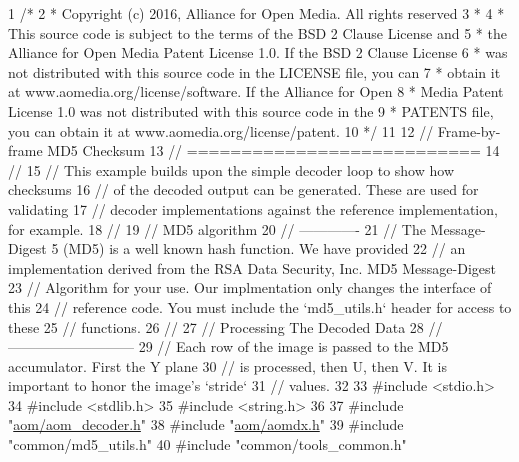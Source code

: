\begin{DoxyCodeInclude}
1 \textcolor{comment}{/*}
2 \textcolor{comment}{ * Copyright (c) 2016, Alliance for Open Media. All rights reserved}
3 \textcolor{comment}{ *}
4 \textcolor{comment}{ * This source code is subject to the terms of the BSD 2 Clause License and}
5 \textcolor{comment}{ * the Alliance for Open Media Patent License 1.0. If the BSD 2 Clause License}
6 \textcolor{comment}{ * was not distributed with this source code in the LICENSE file, you can}
7 \textcolor{comment}{ * obtain it at www.aomedia.org/license/software. If the Alliance for Open}
8 \textcolor{comment}{ * Media Patent License 1.0 was not distributed with this source code in the}
9 \textcolor{comment}{ * PATENTS file, you can obtain it at www.aomedia.org/license/patent.}
10 \textcolor{comment}{ */}
11 
12 \textcolor{comment}{// Frame-by-frame MD5 Checksum}
13 \textcolor{comment}{// ===========================}
14 \textcolor{comment}{//}
15 \textcolor{comment}{// This example builds upon the simple decoder loop to show how checksums}
16 \textcolor{comment}{// of the decoded output can be generated. These are used for validating}
17 \textcolor{comment}{// decoder implementations against the reference implementation, for example.}
18 \textcolor{comment}{//}
19 \textcolor{comment}{// MD5 algorithm}
20 \textcolor{comment}{// -------------}
21 \textcolor{comment}{// The Message-Digest 5 (MD5) is a well known hash function. We have provided}
22 \textcolor{comment}{// an implementation derived from the RSA Data Security, Inc. MD5 Message-Digest}
23 \textcolor{comment}{// Algorithm for your use. Our implmentation only changes the interface of this}
24 \textcolor{comment}{// reference code. You must include the `md5\_utils.h` header for access to these}
25 \textcolor{comment}{// functions.}
26 \textcolor{comment}{//}
27 \textcolor{comment}{// Processing The Decoded Data}
28 \textcolor{comment}{// ---------------------------}
29 \textcolor{comment}{// Each row of the image is passed to the MD5 accumulator. First the Y plane}
30 \textcolor{comment}{// is processed, then U, then V. It is important to honor the image's `stride`}
31 \textcolor{comment}{// values.}
32 
33 \textcolor{preprocessor}{#include <stdio.h>}
34 \textcolor{preprocessor}{#include <stdlib.h>}
35 \textcolor{preprocessor}{#include <string.h>}
36 
37 \textcolor{preprocessor}{#include "\hyperlink{aom__decoder_8h}{aom/aom\_decoder.h}"}
38 \textcolor{preprocessor}{#include "\hyperlink{aomdx_8h}{aom/aomdx.h}"}
39 \textcolor{preprocessor}{#include "common/md5\_utils.h"}
40 \textcolor{preprocessor}{#include "common/tools\_common.h"}

\end{DoxyCodeInclude}
